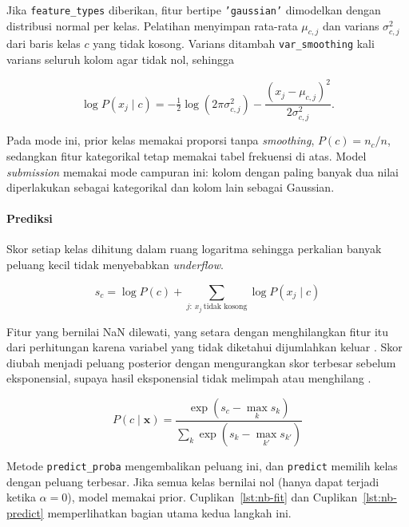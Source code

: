 Jika \texttt{feature\_types} diberikan, fitur bertipe \texttt{'gaussian'}
dimodelkan dengan distribusi normal per kelas. Pelatihan menyimpan rata-rata
$\mu_{c,j}$ dan varians $\sigma^2_{c,j}$ dari baris kelas $c$ yang tidak
kosong. Varians ditambah \texttt{var\_smoothing} kali varians seluruh kolom
agar tidak nol, sehingga

\[
\log P(x_j\mid c)=-\tfrac12\log\left(2\pi\sigma^2_{c,j}\right)-\frac{(x_j-\mu_{c,j})^2}{2\sigma^2_{c,j}}.
\]

Pada mode ini, prior kelas memakai proporsi tanpa \textit{smoothing},
$P(c)=n_c/n$, sedangkan fitur kategorikal tetap memakai tabel frekuensi di
atas. Model \textit{submission} memakai mode campuran ini: kolom dengan
paling banyak dua nilai diperlakukan sebagai kategorikal dan kolom lain
sebagai Gaussian.

\paragraph{Prediksi}
Skor setiap kelas dihitung dalam ruang logaritma sehingga perkalian banyak peluang kecil tidak menyebabkan \textit{underflow}.

\[
s_c=\log P(c)+\sum_{j:\,x_j\ \text{tidak kosong}}\log P(x_j\mid c)
\]

Fitur yang bernilai NaN dilewati, yang setara dengan menghilangkan fitur itu dari perhitungan karena variabel yang tidak diketahui dijumlahkan keluar \cite{ref:materi-14}. Skor diubah menjadi peluang posterior dengan mengurangkan skor terbesar sebelum eksponensial, supaya hasil eksponensial tidak melimpah atau menghilang \cite{ref:blanchard-2021}.

\[
P(c\mid\mathbf{x})=
\frac{\exp\left(s_c-\max_k s_k\right)}
{\sum_{k}\exp\left(s_k-\max_{k'} s_{k'}\right)}
\]

Metode \texttt{predict\_proba} mengembalikan peluang ini, dan \texttt{predict} memilih kelas dengan peluang terbesar. Jika semua kelas bernilai nol (hanya dapat terjadi ketika $\alpha=0$), model memakai prior. Cuplikan~\ref{lst:nb-fit} dan Cuplikan~\ref{lst:nb-predict} memperlihatkan bagian utama kedua langkah ini.

